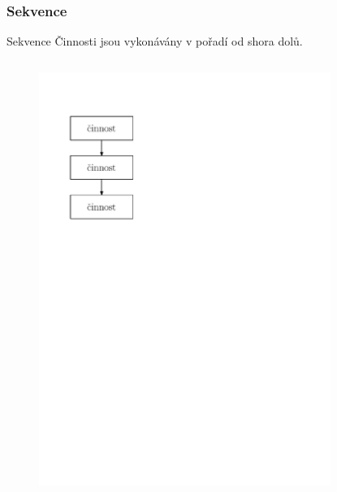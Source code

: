 \documentclass[11pt,aspectratio=169]{beamer}
\begin{document}
    \subsubsection{Sekvence}
    \begin{frame}{Sekvence}
        Činnosti jsou vykonávány v pořadí od shora dolů.
        \begin{columns}
            \begin{column}{.5\textwidth}
                \begin{figure}
                    \centering
                    \includegraphics[scale=.6]{../images/00-vyvojak-sekvence.pdf}
                \end{figure}
            \end{column}
            \begin{column}{.5\textwidth}
                \begin{figure}

\end{figure}
\end{column}
\end{columns}
\end{frame}
\end{document}
